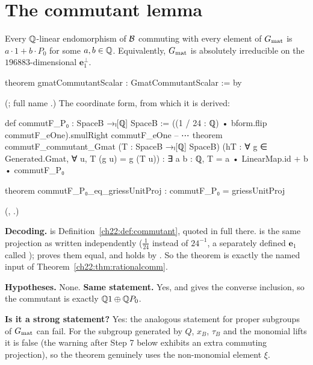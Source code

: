 \section{The commutant lemma}\label{ch22:sec:commutant}

\begin{theorem}\label{ch22:thm:commutant}
Every ${\mathbb{Q}}$-linear endomorphism of $\mathcal{B}$ commuting with every element of $G_{\mathrm{mat}}$ is $a\cdot1+b\cdot P_0$ for
some $a,b\in{\mathbb{Q}}$.  Equivalently, $G_{\mathrm{mat}}$ is absolutely irreducible on the $196883$-dimensional $\mathbf{e}_1^\perp$.
\end{theorem}
\begin{leancode}
theorem gmatCommutantScalar : GmatCommutantScalar := by
\end{leancode}
(; full name
.)  The coordinate form, from which it is derived:
\begin{leancode}
def commutF_P₀ : SpaceB →ₗ[ℚ] SpaceB :=
  ((1 / 24 : ℚ) • bform.flip commutF_eOne).smulRight commutF_eOne
-- ⋯
theorem commutF_commutant_Gmat (T : SpaceB →ₗ[ℚ] SpaceB)
    (hT : ∀ g ∈ Generated.Gmat, ∀ u, T (g u) = g (T u)) :
    ∃ a b : ℚ, T = a • LinearMap.id + b • commutF_P₀
\end{leancode}
\begin{leancode}
theorem commutF_P₀_eq_griessUnitProj : commutF_P₀ = griessUnitProj
\end{leancode}
(, .)
\begin{dictionary}
\textbf{Decoding.}   is Definition~\ref{ch22:def:commutant}, quoted in full there.
 is the same projection as  written independently ($\frac1{24}$ instead of
$24^{-1}$, a separately defined $\mathbf{e}_1$ called );  proves them equal, and
 holds by .  So the theorem is exactly the named input of
Theorem~\ref{ch22:thm:rationalcomm}.

\textbf{Hypotheses.}  None.  \textbf{Same statement.}  Yes, and  gives the converse
inclusion, so the commutant is exactly ${\mathbb{Q}}1\oplus{\mathbb{Q}} P_0$.

\textbf{Is it a strong statement?}  Yes: the analogous statement for proper subgroups of $G_{\mathrm{mat}}$ can fail.  For
the subgroup generated by $Q$, $x_B$, $\tau_B$ and the monomial lifts it is false (the warning after Step 7 below exhibits an
extra commuting projection), so the theorem genuinely uses the non-monomial element $\xi$.
\end{dictionary}

